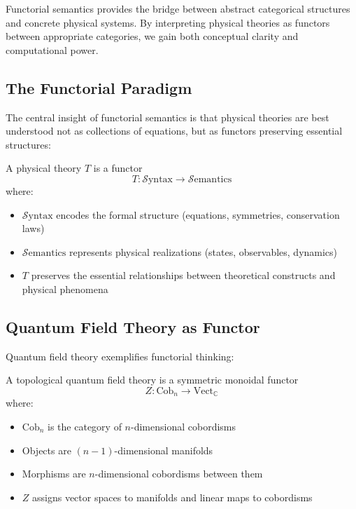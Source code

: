 Functorial semantics provides the bridge between abstract categorical structures and concrete physical systems. By interpreting physical theories as functors between appropriate categories, we gain both conceptual clarity and computational power.

\subsection{The Functorial Paradigm}

The central insight of functorial semantics is that physical theories are best understood not as collections of equations, but as functors preserving essential structures:

\begin{definition}
A physical theory $T$ is a functor
\[
T: \mathcal{S}\text{yntax} \to \mathcal{S}\text{emantics}
\]
where:
\begin{itemize}
\item $\mathcal{S}\text{yntax}$ encodes the formal structure (equations, symmetries, conservation laws)
\item $\mathcal{S}\text{emantics}$ represents physical realizations (states, observables, dynamics)
\item $T$ preserves the essential relationships between theoretical constructs and physical phenomena
\end{itemize}
\end{definition}

\subsection{Quantum Field Theory as Functor}

Quantum field theory exemplifies functorial thinking:

\begin{theorem}
A topological quantum field theory is a symmetric monoidal functor
\[
Z: \text{Cob}_n \to \text{Vect}_{\mathbb{C}}
\]
where:
\begin{itemize}
\item $\text{Cob}_n$ is the category of $n$-dimensional cobordisms
\item Objects are $(n-1)$-dimensional manifolds
\item Morphisms are $n$-dimensional cobordisms between them
\item $Z$ assigns vector spaces to manifolds and linear maps to cobordisms
\end{itemize}
\end{theorem}

